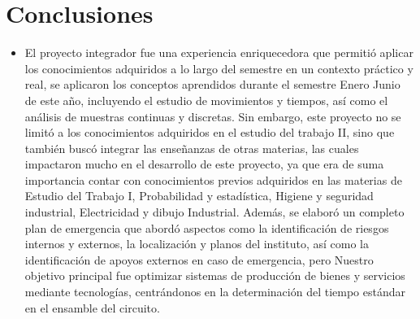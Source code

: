     \section{Conclusiones}
    \begin{itemize}
        \item El proyecto integrador fue una experiencia enriquecedora que permitió aplicar los conocimientos adquiridos a lo largo del semestre en un contexto práctico y real, se aplicaron los conceptos aprendidos durante el semestre Enero Junio de este año, incluyendo el estudio de movimientos y tiempos, así como el análisis de muestras continuas y discretas. Sin embargo, este proyecto no se limitó a los conocimientos adquiridos en el estudio del trabajo II, sino que también buscó integrar las enseñanzas de otras materias, las cuales impactaron mucho en el desarrollo de este proyecto, ya que era de suma importancia contar con conocimientos previos adquiridos en las materias de Estudio del Trabajo I, Probabilidad y estadística, Higiene y seguridad industrial, Electricidad y dibujo Industrial. Además, se elaboró un completo plan de emergencia que abordó aspectos como la identificación de riesgos internos y externos, la localización y planos del instituto, así como la identificación de apoyos externos en caso de emergencia, pero Nuestro objetivo principal fue optimizar sistemas de producción de bienes y servicios mediante tecnologías, centrándonos en la determinación del tiempo estándar en el ensamble del circuito.
    \end{itemize}
    
